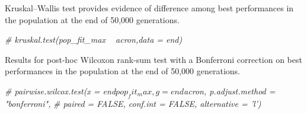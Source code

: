 \documentclass[]{book}
\newenvironment{Shaded}{\begin{snugshade}}{\end{snugshade}}
\newcommand{\CommentTok}[1]{\textcolor[rgb]{0.56,0.35,0.01}{\textit{#1}}}
\begin{document}
Kruskal--Wallis test provides evidence of difference among best performances in the population at the end of 50,000 generations.

\begin{Shaded}
\begin{Highlighting}[]
\CommentTok{# kruskal.test(pop_fit_max ~ acron,data = end)}
\end{Highlighting}
\end{Shaded}

Results for post-hoc Wilcoxon rank-sum test with a Bonferroni correction on best performances in the population at the end of 50,000 generations.

\begin{Shaded}
\begin{Highlighting}[]
\CommentTok{# pairwise.wilcox.test(x = end$pop_fit_max, g = end$acron, p.adjust.method = "bonferroni",}
\CommentTok{#                      paired = FALSE, conf.int = FALSE, alternative = 'l')}
\end{Highlighting}
\end{Shaded}


\end{document}

